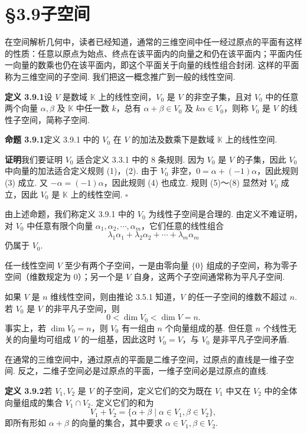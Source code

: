 \documentclass[UTF8,12pt,a4paper,fontset=fandol]{ctexart}
\begin{document}
\section*{§3.9\quad 子空间}

在空间解析几何中，读者已经知道，通常的三维空间中任一经过原点的平面有这样的性质：任意以原点为始点、终点在该平面内的向量之和仍在该平面内；平面内任一向量的数乘也仍在该平面内，即这个平面关于向量的线性组合封闭. 这样的平面称为三维空间的子空间. 我们把这一概念推广到一般的线性空间.

\noindent\textbf{定义 3.9.1}\quad 设 $V$ 是数域 $\mathbb{K}$ 上的线性空间，$V_0$ 是 $V$ 的非空子集，且对 $V_0$ 中的任意两个向量 $\alpha,\beta$ 及 $\mathbb{K}$ 中任一数 $k$，总有 $\alpha+\beta\in V_0$ 及 $k\alpha\in V_0$，则称 $V_0$ 是 $V$ 的线性子空间，简称子空间.

\noindent\textbf{命题 3.9.1}\quad 定义 3.9.1 中的 $V_0$ 在 $V$ 的加法及数乘下是数域 $\mathbb{K}$ 上的线性空间.

\noindent\textbf{证明}\quad 我们要证明 $V_0$ 适合定义 3.3.1 中的 8 条规则. 因为 $V_0$ 是 $V$ 的子集，因此 $V_0$ 中向量的加法适合定义规则 (1)，(2). 由于 $V_0$ 非空，$0=\alpha+(-1)\alpha$，因此规则 (3) 成立. 又 $-\alpha=(-1)\alpha$，因此规则 (4) 也成立. 规则 (5)～(8) 显然对 $V_0$ 成立，因此 $V_0$ 是 $\mathbb{K}$ 上的线性空间. $\square$

由上述命题，我们称定义 3.9.1 中的 $V_0$ 为线性子空间是合理的. 由定义不难证明，对 $V_0$ 中任意有限个向量 $\alpha_1,\alpha_2,\cdots,\alpha_m$，它们任意的线性组合
\[
\lambda_1\alpha_1+\lambda_2\alpha_2+\cdots+\lambda_m\alpha_m
\]
仍属于 $V_0$.

任一线性空间 $V$ 至少有两个子空间，一是由零向量 $\{0\}$ 组成的子空间，称为零子空间（维数规定为 0）；另一个是 $V$ 自身，这两个子空间通常称为平凡子空间.

如果 $V$ 是 $n$ 维线性空间，则由推论 3.5.1 知道，$V$ 的任一子空间的维数不超过 $n$. 若 $V_0$ 是 $V$ 的非平凡子空间，则
\[
0<\dim V_0<\dim V=n.
\]
事实上，若 $\dim V_0=n$，则 $V_0$ 有一组由 $n$ 个向量组成的基. 但任意 $n$ 个线性无关的向量均可组成 $V$ 的一组基，因此这时 $V_0=V$，与 $V_0$ 是非平凡子空间矛盾.

在通常的三维空间中，通过原点的平面是二维子空间，过原点的直线是一维子空间. 反之，二维子空间必是过原点的平面，一维子空间必是过原点的直线.

\noindent\textbf{定义 3.9.2}\quad 若 $V_1,V_2$ 是 $V$ 的子空间，定义它们的交为既在 $V_1$ 中又在 $V_2$ 中的全体向量组成的集合 $V_1\cap V_2$. 定义它们的和为
\[
V_1+V_2=\{\alpha+\beta\mid \alpha\in V_1,\beta\in V_2\},
\]
即所有形如 $\alpha+\beta$ 的向量的集合，其中要求 $\alpha\in V_1,\beta\in V_2$.
\end{document}
